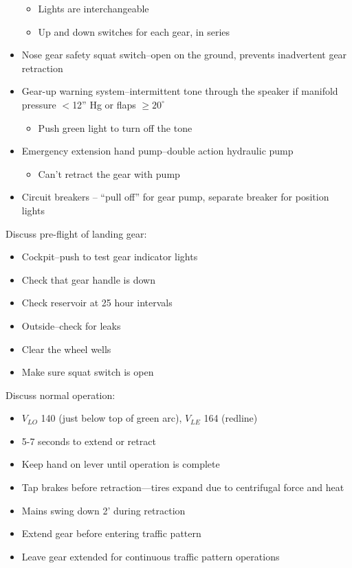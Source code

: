 \documentclass[twoside,openright]{report}
\begin{document}
\begin{itemize}
\begin{itemize}
      \item Lights are interchangeable

      \item Up and down switches for each gear, in series
    \end{itemize}

  \item Nose gear safety squat switch--open on the ground, prevents inadvertent
    gear retraction

  \item Gear-up warning system--intermittent tone through the speaker if
    manifold pressure $<$12'' Hg or flaps $\geq20^{\circ}$
    \begin{itemize}
      \item Push green light to turn off the tone
    \end{itemize}
  \item Emergency extension hand pump--double action hydraulic pump
    \begin{itemize}
      \item Can't retract the gear with pump
    \end{itemize}

  \item Circuit breakers -- ``pull off'' for gear pump, separate breaker for
    position lights
\end{itemize}

Discuss pre-flight of landing gear:

\begin{itemize}
  \item Cockpit--push to test gear indicator lights
  \item Check that gear handle is down
  \item Check reservoir at 25 hour intervals
  \item Outside--check for leaks
  \item Clear the wheel wells
  \item Make sure squat switch is open
\end{itemize}

Discuss normal operation:

\begin{itemize}
  \item $V_{LO}$ 140 (just below top of green arc), $V_{LE}$ 164 (redline)

  \item 5-7 seconds to extend or retract

  \item Keep hand on lever until operation is complete

  \item Tap brakes before retraction—tires expand due to centrifugal force and
    heat

  \item Mains swing down 2' during retraction

  \item Extend gear before entering traffic pattern

  \item Leave gear extended for continuous traffic pattern operations
\end{itemize}
\end{document}
